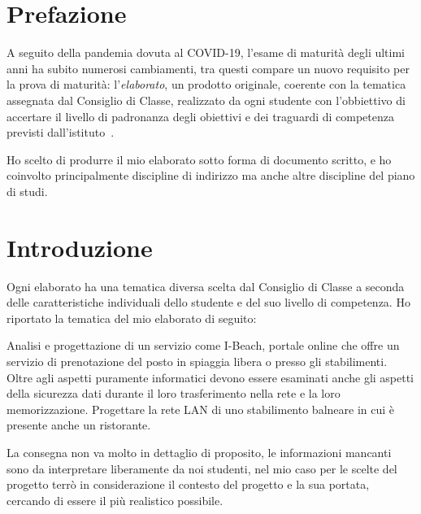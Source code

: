 \section*{Prefazione}
A seguito della pandemia dovuta al COVID-19, l'esame di maturit\`a degli ultimi anni ha subito numerosi cambiamenti, tra questi compare un nuovo requisito per la prova di maturit\`a: l'\emph{elaborato}, un prodotto originale, coerente con la tematica assegnata dal Consiglio di Classe, realizzato da ogni studente con l'obbiettivo di accertare il livello di padronanza degli obiettivi e dei traguardi di competenza previsti dall'istituto~\cite{elaborato-intro}.

Ho scelto di produrre il mio elaborato sotto forma di documento scritto, e ho coinvolto principalmente discipline di indirizzo ma anche altre discipline del piano di studi.

\section{Introduzione}
Ogni elaborato ha una tematica diversa scelta dal Consiglio di Classe a seconda delle caratteristiche individuali dello studente e del suo livello di competenza. Ho riportato la tematica del mio elaborato di seguito:

\begin{center}
    \begin{minipage}{0.8\linewidth}
        Analisi e progettazione di un servizio come I-Beach, portale online che offre un
        servizio di prenotazione del posto in spiaggia libera o presso gli stabilimenti.
        Oltre agli aspetti puramente informatici devono essere esaminati anche gli aspetti
        della sicurezza dati durante il loro trasferimento nella rete e la loro
        memorizzazione. Progettare la rete LAN di uno stabilimento balneare in cui è presente
        anche un ristorante. 
    \end{minipage}
\end{center}

La consegna non va molto in dettaglio di proposito, le informazioni mancanti sono da interpretare liberamente da noi studenti, nel mio caso per le scelte del progetto terr\`o in considerazione il contesto del progetto e la sua portata, cercando di essere il pi\`u realistico possibile.